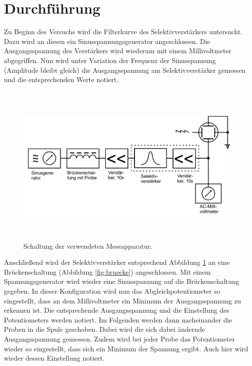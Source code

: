 \section{Durchführung}
\label{sec:Durchführung}
Zu Beginn des Versuchs wird die Filterkurve des Selektivverstärkers untersucht.
Dazu wird an diesen ein Sinusspannungsgenerator angeschlossen. Die Ausgangsspannung
des Verstärkers wird wiederum mit einem Millivoltmeter abgegriffen. Nun wird unter
Variation der Frequenz der Sinusspannung (Amplitude bleibt gleich) die Ausgangsspannung
am Selektivverstärker gemessen und die entsprechenden Werte notiert.

\begin{figure}[H]
  \centering
  \includegraphics[height=8cm]{Schaltung.PNG}
  \caption{Schaltung der verwendeten Messapparatur. \cite{sample}}
  \label{fig:Schaltung}
\end{figure}

Anschließend wird der Selektivverstärker entsprechend Abbildung \ref{fig:Schaltung}
an eine Brückenschaltung (Abbildung \ref{fig:bruecke}) angeschlossen. Mit einem
Spannungsgenerator wird wieder eine Sinusspannung auf die Brückenschaltung gegeben.
In dieser Konfiguration wird nun das Abgleichpotentiometer so eingestellt, dass an
dem Millivoltmeter ein Minimum der Ausgangsspannung zu erkennen ist. Die entsprechende
Ausgangsspannung und die Einstellung des Potentiometers werden notiert. Im Folgenden werden dann nacheinander die Proben in
die Spule geschoben. Dabei wird die sich dabei ändernde Ausgangsspannung gemessen.
Zudem wird bei jeder Probe das Potentiometer wieder so eingestellt, dass sich ein
Minimum der Spannung ergibt. Auch hier wird wieder dessen Einstellung notiert.
